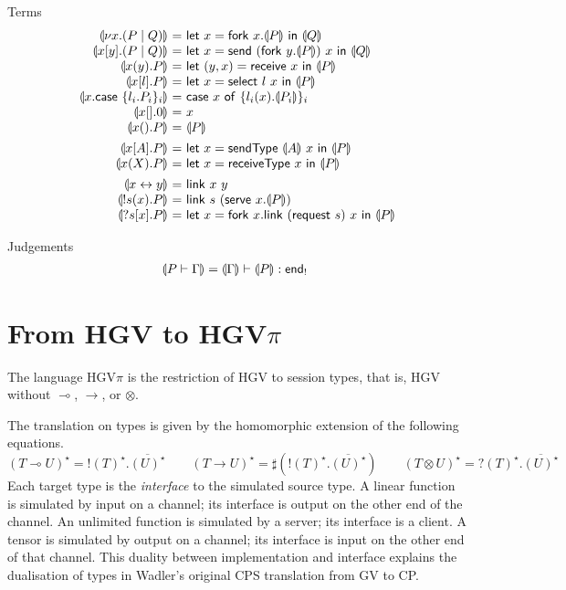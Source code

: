 \documentclass{easychair}
\makeatletter
\newcommand{\ba}{\begin{array}}
\newcommand{\ea}{\end{array}}
\newenvironment{equations}{\[\ba{@{}r@{~}c@{~}l@{}}}{\ea\]}
\newcommand{\key}{\mathsf}
\newcommand{\set}[1]{\{ #1 \}}
\newcommand{\cptogv}[1]{\llparenthesis{#1}\rrparenthesis}
\newcommand{\row}[2]{\set{#1}_{#2}}
\newcommand{\gvOutput}[2]{\mathord{!}{#1}.{#2}}
\newcommand{\gvInput}[2]{\mathord{?}{#1}.{#2}}
\newcommand{\gvEndOutput}{\key{end}_!}
\newcommand{\gvService}[1]{\sharp {#1}}
\newcommand{\gvDual}[1]{\overline{#1}}
\newcommand{\cpj}[2]{{#1} \vdash {#2}}
\newcommand{\gvj}[3]{{#1} \vdash {#2} : {#3}}
\newcommand{\la}{l}
\newcommand{\G}{\Gamma}
\newcommand{\lolli}{\multimap}
\newcommand{\gvLinFun}[2]{{#1} \lolli {#2}}
\newcommand{\gvUnFun}[2]{{#1} \to {#2}}
\newcommand{\gvTimes}[2]{{#1} \otimes {#2}}
\newcommand{\gvLink}[2]{\key{link}~{#1}~{#2}}
\newcommand{\gvPair}[2]{({#1},{#2})}
\newcommand{\gvLet}[3]{\key{let}~{#1}={#2}~\key{in}~{#3}}
\newcommand{\gvSend}[2]{\key{send}~{#1}~{#2}}
\newcommand{\gvReceive}[1]{\key{receive}~{#1}}
\newcommand{\gvSelect}[2]{\key{select}~{#1}~{#2}}
\newcommand{\gvCase}[2]{\key{case}~{#1}~\key{of}~{#2}}
\newcommand{\gvFork}[2]{\key{fork}~{#1}.{#2}}
\newcommand{\gvTerminate}[1]{\key{terminate}~{#1}}
\newcommand{\gvSendType}[2]{\key{sendType}~{#1}~{#2}}
\newcommand{\gvReceiveType}[1]{\key{receiveType}~{#1}}
\newcommand{\gvServe}[2]{\key{serve}~{#1}.{#2}}
\newcommand{\gvRequest}[1]{\key{request}~{#1}}
\newcommand{\cpLink}[2]{{#1} \leftrightarrow {#2}}
\newcommand{\cpCut}[3]{\nu {#1}.({#2} \mid {#3})}
\newcommand{\cpOutput}[4]{{#1}[{#2}].({#3} \mid {#4})}
\newcommand{\cpInput}[3]{{#1}({#2}).{#3}}
\newcommand{\cpInject}[3]{{#1}[{#2}].{#3}}
\newcommand{\cpCase}[2]{{#1}.\key{case}~{#2}}
\newcommand{\cpServe}[3]{!{#1}({#2}).{#3}}
\newcommand{\cpRequest}[3]{?{#1}[{#2}].{#3}}
\newcommand{\cpEmptyOut}[1]{{#1}[].0}
\newcommand{\cpEmptyIn}[2]{{#1}().{#2}}
\newcommand{\cpSendType}[3]{{#1}[{#2}].{#3}}
\newcommand{\cpReceiveType}[3]{{#1}({#2}).{#3}}
\newcommand{\hgv}{HGV\xspace}
\newcommand{\hgvpi}{HGV$\pi$\xspace}
\newcommand{\lampi}[1]{({#1})^\star}
\makeatother
\begin{document}
Terms
\begin{equations}
\cptogv{\cpCut{x}{P}{Q}} &=&
  \gvLet{x}{\gvFork{x}{\cptogv{P}}}{\cptogv{Q}} \\
\cptogv{\cpOutput{x}{y}{P}{Q}} &=&
  \gvLet{x}{\gvSend{(\gvFork{y}{\cptogv{P}})}{x}}{\cptogv{Q}} \\
\cptogv{\cpInput{x}{y}{P}} &=&
  \gvLet{\gvPair{y}{x}}{\gvReceive{x}}{\cptogv{P}} \\
\cptogv{\cpInject{x}{\la}{P}} &=&
  \gvLet{x}{\gvSelect{\la}{x}}{\cptogv{P}} \\
\cptogv{\cpCase{x}{\row{\la_i.P_i}{i}}} &=&
  \gvCase{x}{\row{\la_i(x).\cptogv{P_i}}{i}} \\
\cptogv{\cpEmptyOut{x}} &=& x \\
\cptogv{\cpEmptyIn{x}{P}} &=& \cptogv{P} \\[1ex]

\cptogv{\cpSendType{x}{A}{P}} &=&
  \gvLet{x}{\gvSendType{\cptogv{A}}{x}}{\cptogv{P}} \\
\cptogv{\cpReceiveType{x}{X}{P}} &=&
  \gvLet{x}{\gvReceiveType{x}}{\cptogv{P}} \\[1ex]

\cptogv{\cpLink{x}{y}} &=& \gvLink{x}{y} \\
\cptogv{\cpServe{s}{x}{P}} &=&
  \gvLink{s}{(\gvServe{x}{\cptogv{P}})} \\
\cptogv{\cpRequest{s}{x}{P}} &=&
  \gvLet{x}{\gvFork{x}{\gvLink{(\gvRequest{s})}{x}}}{\cptogv{P}} \\
\end{equations}

Judgements
\begin{equations}
\cptogv{\cpj{P}{\G}} = \gvj{\cptogv{\G}}{\cptogv{P}}{\gvEndOutput}
\end{equations}

\section{From \hgv to \hgvpi}


The language \hgvpi is the restriction of \hgv to session types,
that is, \hgv without $\lolli$, $\to$, or $\otimes$.

The translation on types is given by the homomorphic extension of the
following equations.
\[
\lampi{\gvLinFun{T}{U}} = \gvOutput{\lampi{T}}{\gvDual{\lampi{U}}} \qquad
\lampi{\gvUnFun{T}{U}} = \gvService{(\gvOutput{\lampi{T}}{\gvDual{\lampi{U}}})} \qquad
\lampi{\gvTimes{T}{U}} = \gvInput{\lampi{T}}{\gvDual{\lampi{U}}}
\]%
Each target type is the \emph{interface} to the simulated source
type. A linear function is simulated by input on a channel; its
interface is output on the other end of the channel. An unlimited
function is simulated by a server; its interface is a client. A tensor
is simulated by output on a channel; its interface is input on the
other end of that channel.
%
This duality between implementation and interface explains the
dualisation of types in Wadler's original CPS translation from GV to
CP.
\end{document}
